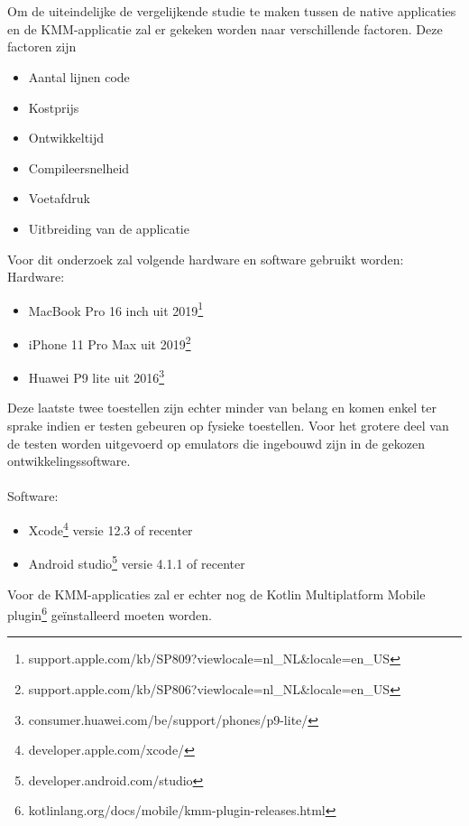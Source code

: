 \\ \\
Om de uiteindelijke de vergelijkende studie te maken tussen de native applicaties en de KMM-applicatie zal er gekeken worden naar verschillende factoren. Deze factoren zijn
\begin{itemize}
    \item Aantal lijnen code
    \item Kostprijs
    \item Ontwikkeltijd
    \item Compileersnelheid
    \item Voetafdruk
    \item Uitbreiding van de applicatie
\end{itemize}

Voor dit onderzoek zal volgende hardware en software gebruikt worden:\\
Hardware:
\begin{itemize}
    \item MacBook Pro 16 inch uit 2019\footnote{support.apple.com/kb/SP809?viewlocale=nl\_NL\&locale=en\_US}
    \item iPhone 11 Pro Max uit 2019\footnote{support.apple.com/kb/SP806?viewlocale=nl\_NL\&locale=en\_US}
    \item Huawei P9 lite uit 2016\footnote{consumer.huawei.com/be/support/phones/p9-lite/}
\end{itemize}
Deze laatste twee toestellen zijn echter minder van belang en komen enkel ter sprake indien er testen gebeuren op fysieke toestellen. Voor het grotere deel van de testen worden uitgevoerd op emulators die ingebouwd zijn in de gekozen ontwikkelingssoftware.\\
\\
Software:
\begin{itemize}
    \item Xcode\footnote{developer.apple.com/xcode/} versie 12.3 of recenter
    \item Android studio\footnote{developer.android.com/studio} versie 4.1.1 of recenter
\end{itemize}
Voor de KMM-applicaties zal er echter nog de Kotlin Multiplatform Mobile plugin\footnote{kotlinlang.org/docs/mobile/kmm-plugin-releases.html} geïnstalleerd moeten worden.

